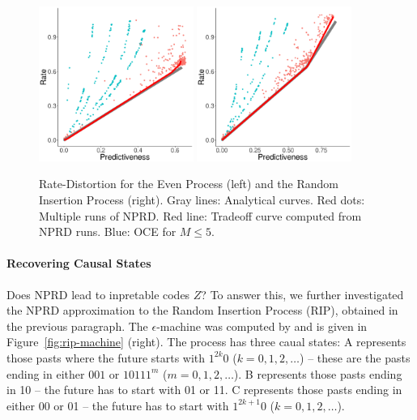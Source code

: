 \documentclass[11pt,letterpaper]{article}
\begin{document}
\begin{figure}
\includegraphics[width=0.45\textwidth]{code/figures/even-info.pdf}
\includegraphics[width=0.45\textwidth]{code/figures/rip-info.pdf}

	\caption{Rate-Distortion for the Even Process (left) and the Random Insertion Process (right). Gray lines: Analytical curves. Red dots: Multiple runs of NPRD. Red line: Tradeoff curve computed from NPRD runs. Blue: OCE for $M\leq 5$. }\label{fig:even}
\end{figure}

\paragraph{Recovering Causal States}
Does NPRD lead to inpretable codes $Z$?
To answer this, we further investigated the NPRD approximation to the Random Insertion Process (RIP), obtained in the previous paragraph.
The $\epsilon$-machine was computed by  \cite{marzen-predictive-2016} and is given in Figure~\ref{fig:rip-machine} (right).
The process has three caual states:
A represents those pasts where the future starts with $1^{2k}0$ ($k = 0, 1, 2, \dots$) -- these are the pasts ending in either $001$ or $10111^m$ ($m= 0, 1, 2, \dots$). %
B represents those pasts ending in 10 -- the future has to start with 01 or 11.
C represents those pasts ending in either 00 or 01 -- the future has to start with $1^{2k+1}0$ ($k = 0, 1, 2, \dots$).
\end{document}
